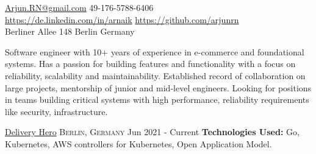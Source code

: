 \documentclass[10pt,a4paper]{article}
\begin{document}
\sloppy  %


\nobreakvspace{0.3em}  %

\noindent\href{mailto:Arjun.RN@gmail.com}{Arjun.RN\mbox{}@\mbox{}gmail.com}\sbull
\textsmaller{+}49-176-5788-6406
\\
\sbull
\href{https://de.linkedin.com/in/arnaik}{https://de.linkedin.com/in/arnaik}
\sbull
\href{https://github.com/arjunrn}{https://github.com/arjunrn}
\\
Berliner Allee 148\sbull
Berlin\sbull
Germany

\spacedhrule{0.9em}{-0.4em}  %


\vspace{-1.3em}  %

\begin{multicols}{2}  %
	Software engineer with 10+ years of experience in e-commerce and
	foundational systems. Has a passion for building features and functionality
	with a focus on reliability, scalability and maintainability. Established
	record of collaboration on large projects, mentorship of junior and
	mid-level engineers. Looking for positions in teams building critical
	systems with high performance, reliability requirements like security,
	infrastructure.
\end{multicols}

\spacedhrule{0em}{-0.4em}


\headedsection
{\href{https://deliveryhero.com/}{Delivery Hero}}
{\textsc{Berlin, Germany}}
{
	\headedsubsection
	{}
	{Jun 2021 - Current}
	{
		\textbf{Technologies Used:} Go, Kubernetes, AWS controllers for Kubernetes, Open Application Model.
	}
}
\end{document}
